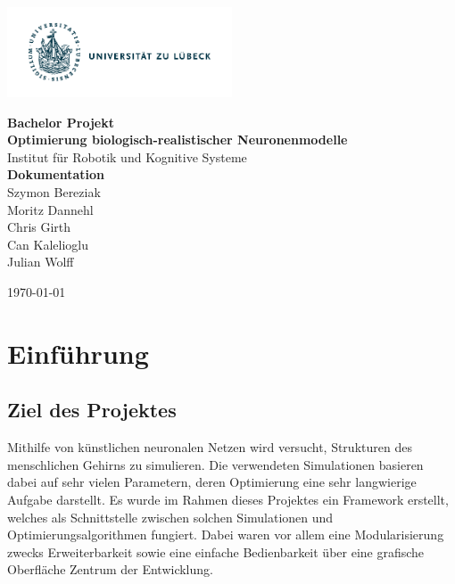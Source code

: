 \documentclass[
  a4paper,               %
  twoside,               %
  DIV=12,                %
  BCOR=8mm,              %
  headinclude=true,      %
  footinclude=false,     %
  numbers=noenddot,      %
  headheight=40pt,       %
  11pt]{scrartcl}        %
\begin{document}
\begin{titlepage}

\flushleft\includegraphics[width=0.5\textwidth]{./Logo_Uni_Luebeck_CMYK} \\[1cm]
\color{unifarbe}
\begin{center}
\textbf{\Huge Bachelor Projekt} \\[0.5cm]
\textbf{\Huge Optimierung biologisch-realistischer Neuronenmodelle}\\[0.5cm]

Institut für Robotik und Kognitive Systeme\\[2.5cm]
\textbf{\Large Dokumentation}\\[1.5cm]

Szymon Bereziak\\
Moritz Dannehl\\
Chris Girth\\
Can Kalelioglu\\
Julian Wolff\\
\end{center}

\vfill
\today

\end{titlepage}
\tableofcontents\newpage
\section{Einführung}
\subsection{Ziel des Projektes}

Mithilfe von künstlichen neuronalen Netzen wird versucht, Strukturen des menschlichen Gehirns zu simulieren. Die verwendeten Simulationen basieren dabei auf sehr vielen Parametern, deren Optimierung eine sehr langwierige Aufgabe darstellt. Es wurde im Rahmen dieses Projektes ein Framework erstellt, welches als Schnittstelle zwischen solchen Simulationen und Optimierungsalgorithmen fungiert. Dabei waren vor allem eine Modularisierung zwecks Erweiterbarkeit sowie eine einfache Bedienbarkeit über eine grafische Oberfläche Zentrum der Entwicklung.
\end{document}
